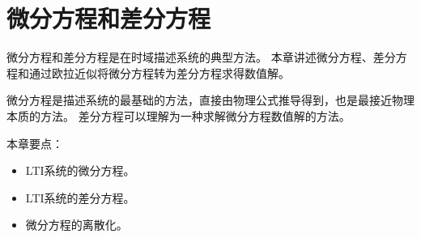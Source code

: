 \chapter{微分方程和差分方程}

微分方程和差分方程是在时域描述系统的典型方法。
本章讲述微分方程、差分方程和通过欧拉近似将微分方程转为差分方程求得数值解。

微分方程是描述系统的最基础的方法，直接由物理公式推导得到，也是最接近物理本质的方法。
差分方程可以理解为一种求解微分方程数值解的方法。

本章要点：
\begin{itemize}
    \item LTI系统的微分方程。
    \item LTI系统的差分方程。
    \item 微分方程的离散化。
\end{itemize}

\newpage


\newpage


\newpage


\newpage





